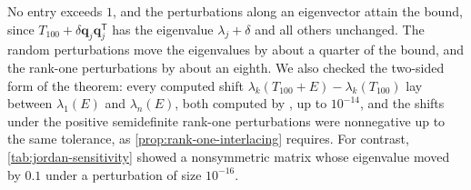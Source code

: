 \begin{table}
\end{table}

No entry exceeds $1$, and the perturbations along an eigenvector attain the bound, since $T_{100}+\delta\mathbf q_j\mathbf q_j^{\mathsf T}$ has the eigenvalue $\lambda_j+\delta$ and all others unchanged. The random perturbations move the eigenvalues by about a quarter of the bound, and the rank-one perturbations by about an eighth. We also checked the two-sided form of the theorem: every computed shift $\lambda_k(T_{100}+E)-\lambda_k(T_{100})$ lay between $\lambda_1(E)$ and $\lambda_n(E)$, both computed by , up to $10^{-14}$, and the shifts under the positive semidefinite rank-one perturbations were nonnegative up to the same tolerance, as \cref{prop:rank-one-interlacing} requires. For contrast, \cref{tab:jordan-sensitivity} showed a nonsymmetric matrix whose eigenvalue moved by $0.1$ under a perturbation of size $10^{-16}$.

